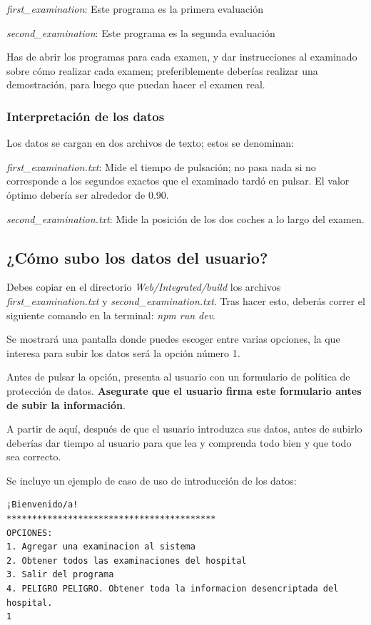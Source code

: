 \documentclass[12pt,a4paper,twoside,openright]{book}
\begin{document}
\begin{umaappendices}
\textit{first\_examination}: Este programa es la primera evaluación

\textit{second\_examination}: Este programa es la segunda evaluación

Has de abrir los programas para cada examen, y dar instrucciones al examinado sobre cómo realizar cada examen; preferiblemente deberías realizar una demostración, para luego que puedan hacer el examen real.

\subsubsection{Interpretación de los datos}

Los datos se cargan en dos archivos de texto; estos se denominan:

\textit{first\_examination.txt}: Mide el tiempo de pulsación; no pasa nada si no corresponde a los segundos exactos que el examinado tardó en pulsar. El valor óptimo debería ser alrededor de 0.90.

\textit{second\_examination.txt}: Mide la posición de los dos coches a lo largo del examen.

\subsection{¿Cómo subo los datos del usuario?}

Debes copiar en el directorio \textit{Web/Integrated/build} los archivos \textit{first\_examination.txt} y \textit{second\_examination.txt}. Tras hacer esto, deberás correr el siguiente comando en la terminal: \textit{npm run dev}.

Se mostrará una pantalla donde puedes escoger entre varias opciones, la que interesa para subir los datos será la opción número 1.

Antes de pulsar la opción, presenta al usuario con un formulario de política de protección de datos. \textbf{Asegurate que el usuario firma este formulario antes de subir la información}.

A partir de aquí, después de que el usuario introduzca sus datos, antes de subirlo deberías dar tiempo al usuario para que lea y comprenda todo bien y que todo sea correcto.

Se incluye un ejemplo de caso de uso de introducción de los datos:

\begin{verbatim}
¡Bienvenido/a!
*****************************************
OPCIONES:
1. Agregar una examinacion al sistema
2. Obtener todos las examinaciones del hospital
3. Salir del programa
4. PELIGRO PELIGRO. Obtener toda la informacion desencriptada del hospital.
1


\end{verbatim}
\end{umaappendices}
\end{document}
